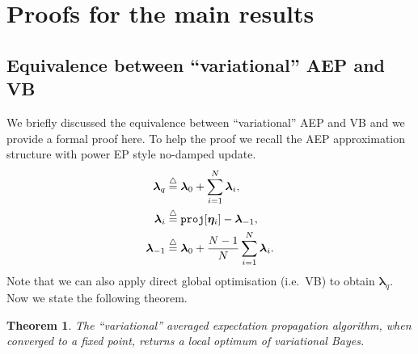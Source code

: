 \documentclass{article} %
\newtheorem{theorem}{Theorem}
\begin{document}
\section*{Proofs for the main results}
\subsection*{Equivalence between ``variational'' AEP and VB}
We briefly discussed the equivalence between ``variational'' AEP and VB and we provide a formal proof here. To help the proof we recall the AEP approximation structure with power EP style no-damped update. 
%
\begin{align}
\bm{\lambda}_q &\buildrel\triangle\over = \bm{\lambda}_0 + \sum_{i=1}^N \bm{\lambda}_i, \\
\bm{\lambda}_i &\buildrel\triangle\over = \mathtt{proj}[\bm{\eta}_i] - \bm{\lambda}_{-1}, \\
\bm{\lambda}_{-1} &\buildrel\triangle\over = \bm{\lambda}_0 + \frac{N-1}{N} \sum_{i=1}^N \bm{\lambda}_i.
\end{align}
%
Note that we can also apply direct global optimisation (i.e.~VB) to obtain $\bm{\lambda}_q$. Now we state the following theorem. 
%
\begin{theorem}
The ``variational'' averaged expectation propagation algorithm, when converged to a fixed point, returns a local optimum of variational Bayes.
\end{theorem}
\end{document}
